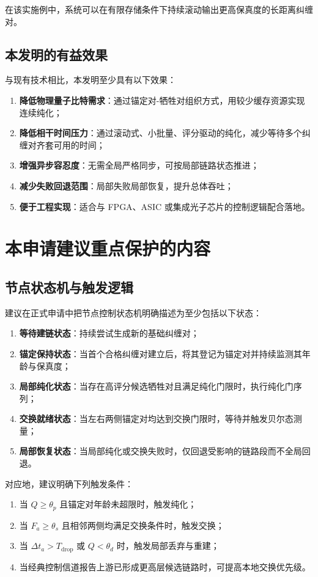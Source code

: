 \documentclass[12pt,a4paper]{article}
\begin{document}
在该实施例中，系统可以在有限存储条件下持续滚动输出更高保真度的长距离纠缠对。

\subsection{本发明的有益效果}

与现有技术相比，本发明至少具有以下效果：
\begin{enumerate}[label=(\arabic*)]
    \item \textbf{降低物理量子比特需求}：通过锚定对-牺牲对组织方式，用较少缓存资源实现连续纯化；
    \item \textbf{降低相干时间压力}：通过滚动式、小批量、评分驱动的纯化，减少等待多个纠缠对齐套可用的时间；
    \item \textbf{增强异步容忍度}：无需全局严格同步，可按局部链路状态推进；
    \item \textbf{减少失败回退范围}：局部失败局部恢复，提升总体吞吐；
    \item \textbf{便于工程实现}：适合与 FPGA、ASIC 或集成光子芯片的控制逻辑配合落地。
\end{enumerate}

\section{本申请建议重点保护的内容}

\subsection{节点状态机与触发逻辑}

建议在正式申请中把节点控制状态机明确描述为至少包括以下状态：
\begin{enumerate}[label=(\arabic*)]
    \item \textbf{等待建链状态}：持续尝试生成新的基础纠缠对；
    \item \textbf{锚定保持状态}：当首个合格纠缠对建立后，将其登记为锚定对并持续监测其年龄与保真度；
    \item \textbf{局部纯化状态}：当存在高评分候选牺牲对且满足纯化门限时，执行纯化门序列；
    \item \textbf{交换就绪状态}：当左右两侧锚定对均达到交换门限时，等待并触发贝尔态测量；
    \item \textbf{局部恢复状态}：当局部纯化或交换失败时，仅回退受影响的链路段而不全局回退。
\end{enumerate}

对应地，建议明确下列触发条件：
\begin{enumerate}[label=(\arabic*)]
    \item 当 $Q \ge \theta_p$ 且锚定对年龄未超限时，触发纯化；
    \item 当 $F_a \ge \theta_s$ 且相邻两侧均满足交换条件时，触发交换；
    \item 当 $\Delta t_a > T_{\mathrm{drop}}$ 或 $Q < \theta_d$ 时，触发局部丢弃与重建；
    \item 当经典控制信道报告上游已形成更高层候选链路时，可提高本地交换优先级。
\end{enumerate}
\end{document}
